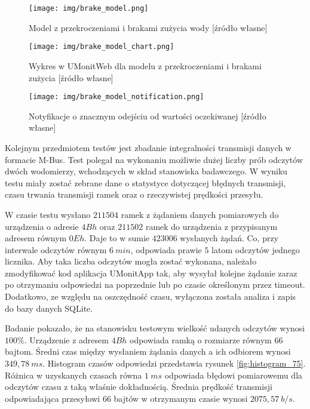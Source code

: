 \begin{figure}[H]
	\centering
	\texttt{[image: img/brake\_model.png]}
	\caption[Model z przekroczeniami i brakami zużycia wody]{Model z przekroczeniami i brakami zużycia wody [źródło własne]}
	\label{fig:brake_model}
\end{figure}

\begin{figure}[H]
	\centering
	\texttt{[image: img/brake\_model\_chart.png]}
	\caption[Wykres w UMonitWeb dla modelu z przekroczeniami i brakami zużycia]{Wykres w UMonitWeb dla modelu z przekroczeniami i brakami zużycia [źródło własne]}
	\label{fig:brake_model_chart}
\end{figure}

\begin{figure}[H]
	\centering
	\texttt{[image: img/brake\_model\_notification.png]}
	\caption[Notyfikacje o znacznym odejściu od wartości oczekiwanej]{Notyfikacje o znacznym odejściu od wartości oczekiwanej [źródło własne]}
	\label{fig:brake_model_notification}
\end{figure}

Kolejnym przedmiotem testów jest zbadanie integralności transmisji danych w formacie M-Bus.
Test polegał na wykonaniu możliwie dużej liczby prób odczytów dwóch wodomierzy, wchodzących w skład stanowiska badawczego.
W wyniku testu miały zostać zebrane dane o statystyce dotyczącej błędnych transmisji, czasu trwania transmisji ramek oraz o rzeczywistej prędkości przesyłu.

W czasie testu wysłano $ 211504 $ ramek z żądaniem danych pomiarowych do urządzenia o adresie $ 4Bh $ oraz $ 211502 $ ramek do urządzenia z przypisanym adresem równym $ 0Eh $.
Daje to w sumie $ 423006 $ wysłanych żądań.
Co, przy interwale odczytów równym $ 6\ min $, odpowiada prawie $ 5 $ latom odczytów jednego licznika.
Aby taka liczba odczytów mogła zostać wykonana, należało zmodyfikować kod aplikacja UMonitApp tak, aby wysyłał kolejne żądanie zaraz po otrzymaniu odpowiedzi na poprzednie lub po czasie określonym przez timeout.
Dodatkowo, ze względu na oszczędność czasu, wyłączona została analiza i zapis do bazy danych SQLite.

Badanie pokazało, że na stanowisku testowym wielkość udanych odczytów wynosi $ 100\% $.
Urządzenie z adresem $ 4Bh $ odpowiada ramką o rozmiarze równym $ 66 $ bajtom.
Średni czas między wysłaniem żądania danych a ich odbiorem wynosi $ 349,78\ ms $.
Histogram czasów odpowiedzi przedstawia rysunek \ref{fig:histogram_75}.
Różnica w uzyskanych czasach równa $ 1 \ ms $ odpowiada błędowi pomiarowemu dla odczytów czasu z taką właśnie dokładnością.
Średnia prędkość transmisji odpowiadająca przesyłowi $ 66 $ bajtów w otrzymanym czasie wynosi $ 2075,57\ b/s $.

